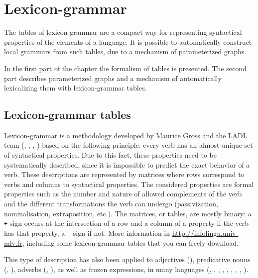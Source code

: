 \chapter{Lexicon-grammar}
\label{chap-lexicon-grammar}
The tables of lexicon-grammar are a compact way for representing syntactical
properties of the elements of a language. It is possible to automatically
construct local grammars from such tables, due to a mechanism of parameterized
graphs. 

\bigskip
\noindent In the first part of the chapter the formalism of tables is presented.
The second part describes parameterized graphs and a mechanism of automatically
lexicalizing them with lexicon-grammar tables.


\section{Lexicon-grammar tables}
Lexicon-grammar is a methodology developed by Maurice Gross and the LADL team
 (\cite{L}, \cite{BGL}, \cite{methodes-en-syntaxe}, \cite{GL}) based
on the following principle: every verb has an almost unique set of syntactical
properties. Due to this fact, these properties need to be systematically
described, since it is impossible to predict the exact behavior of a verb. These
descriptions are represented by matrices where rows correspond to verbs and
columns to syntactical properties. The considered properties are formal
properties such as the number and nature of allowed complements of the verb and
the different transformations the verb can undergo (passivization,
nominalisation, extraposition, etc.). The matrices, or tables, are mostly binary:
a \verb$+$ sign occurs at the intersection of a row and a column of a property if
the verb has that property, a \verb+-+ sign if not.  More information in \url{http://infolingu.univ-mlv.fr}, including
some lexicon-grammar tables that you can freely download.

\bigskip
\noindent This type of description has also been applied to adjectives
(\cite{these-annie}), predicative nouns (\cite{les-nominalisations},
\cite{les-predicats-nominaux}), adverbs (\cite{syntaxe-de-ladverbe},
\cite{grammaire-des-adverbes}), as well as frozen expressions, in many languages
(\cite{lexique-grammaire-allemand2}, \cite{lexique-grammaire-italien2},
\cite{lexique-grammaire-italien}, \cite{lexique-grammaire-coreen2},
\cite{lexique-grammaire-coreen}, \cite{lexique-grammaire-malgache},
\cite{lexique-grammaire-espagnol}, \cite{lexique-grammaire-allemand},
\cite{lexique-grammaire-hongrois}).

